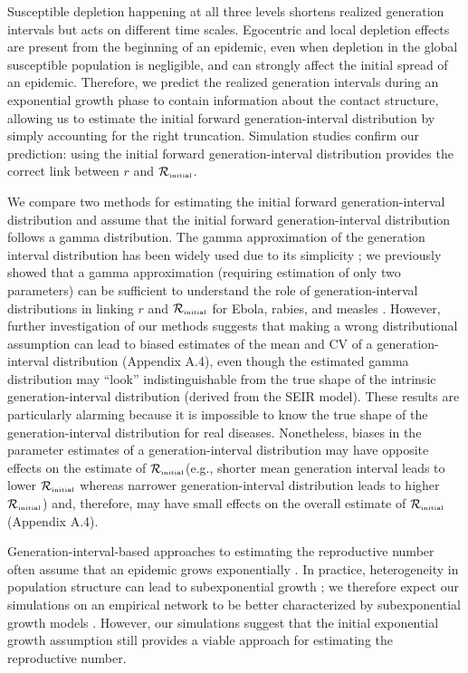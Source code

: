 \documentclass[12pt]{article}
\newcommand{\Rx}[1]{\ensuremath{{\mathcal R}_{#1}}\xspace}
\newcommand{\Rini}{\Rx{\textrm{\tiny initial}}}
\begin{document}
Susceptible depletion happening at all three levels shortens realized generation intervals but acts on different time scales.
Egocentric and local depletion effects are present from the beginning of an epidemic, even when depletion in the global susceptible population is negligible, and can strongly affect the initial spread of an epidemic.
Therefore, we predict the realized generation intervals during an exponential growth phase to contain information about the contact structure, allowing us to estimate the initial forward generation-interval distribution by simply accounting for the right truncation.
Simulation studies confirm our prediction: using the initial forward generation-interval distribution provides the correct link between $r$ and $\Rini$.

We compare two methods for estimating the initial forward generation-interval distribution and assume that the initial forward generation-interval distribution follows a gamma distribution.
The gamma approximation of the generation interval distribution has been widely used due to its simplicity \citep{mcbryde2009early, nishiura2009transmission, roberts2011early, trichereau2012estimation, nishiura2015theoretical};
we previously showed that a gamma approximation (requiring estimation of only two parameters) can be sufficient to understand the role of generation-interval distributions in linking $r$ and $\Rini$ for Ebola, rabies, and measles \citep{park2019practical}.
However, further investigation of our methods suggests that making a wrong distributional assumption can lead to biased estimates of the mean and CV of a generation-interval distribution (Appendix A.4), even though the estimated gamma distribution may ``look'' indistinguishable from the true shape of the intrinsic generation-interval distribution (derived from the SEIR model).
These results are particularly alarming because it is impossible to know the true shape of the generation-interval distribution for real diseases.
Nonetheless, biases in the parameter estimates of a generation-interval distribution may have opposite effects on the estimate of \Rini (e.g., shorter mean generation interval leads to lower \Rini whereas narrower generation-interval distribution leads to higher \Rini) and, therefore, may have small effects on the overall estimate of $\Rini$ (Appendix A.4).

Generation-interval-based approaches to estimating the reproductive number often assume that an epidemic grows exponentially \citep{wearing2005appropriate, wallinga2007generation, roberts2007model, park2019practical}.
In practice, heterogeneity in population structure can lead to subexponential growth \citep{szendroi2004polynomial, chowell2015western, chowell2016growing, chowell2016characterizing, kiskowski2016modeling, viboud2016generalized};
we therefore expect our simulations on an empirical network to be better characterized by subexponential growth models \citep{viboud2016generalized}.
However, our simulations suggest that the initial exponential growth assumption still provides a viable approach for estimating the reproductive number.
\end{document}
